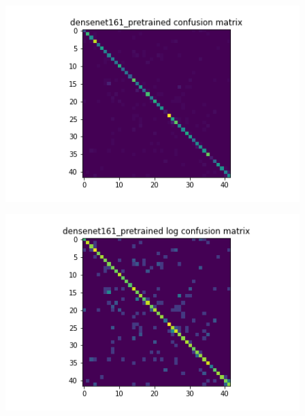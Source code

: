 \begin{figure}[t]
  \begin{minipage}[b]{.5\linewidth}
    \centering
    {\includegraphics[width=1.2\textwidth]{figs/conf_matrix/densenet161_pretrained_conf.png}}
  \end{minipage}
  \hfill
  \begin{minipage}[b]{.5\linewidth}
    \centering

    {\includegraphics[width=1.2\textwidth]{figs/conf_matrix/densenet161_pretrained_log_conf.png}}
  \end{minipage}
  \vfill
  \begin{minipage}[b]{.5\linewidth}
    \centering


\end{minipage}
\end{figure}
